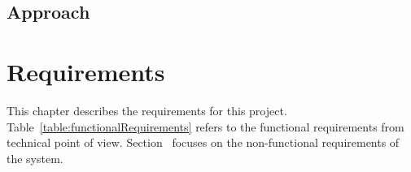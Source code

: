 \documentclass{pdfmx4020}
\begin{document}

  \section{Approach} %
  \label{sec:approach}

  

\chapter{Requirements}
This chapter describes the requirements for this project. Table~\ref{table:functionalRequirements} refers to the functional requirements from technical point of view. Section~ focuses on the non-functional requirements of the system.
\end{document}
